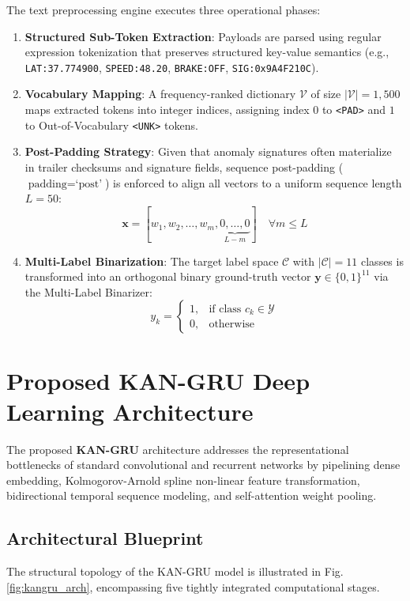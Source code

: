 \documentclass[conference]{IEEEtran}
\begin{document}
The text preprocessing engine executes three operational phases:
\begin{enumerate}
    \item \textbf{Structured Sub-Token Extraction}: Payloads are parsed using regular expression tokenization that preserves structured key-value semantics (e.g., \texttt{LAT:37.774900}, \texttt{SPEED:48.20}, \texttt{BRAKE:OFF}, \texttt{SIG:0x9A4F210C}).
    \item \textbf{Vocabulary Mapping}: A frequency-ranked dictionary $\mathcal{V}$ of size $|\mathcal{V}| = 1,500$ maps extracted tokens into integer indices, assigning index $0$ to \texttt{<PAD>} and $1$ to Out-of-Vocabulary \texttt{<UNK>} tokens.
    \item \textbf{Post-Padding Strategy}: Given that anomaly signatures often materialize in trailer checksums and signature fields, sequence post-padding ($\text{padding} = \text{`post'}$) is enforced to align all vectors to a uniform sequence length $L = 50$:
    \begin{equation}
        \mathbf{x} = [w_1, w_2, \dots, w_m, \underbrace{0, \dots, 0}_{L - m}] \quad \forall m \le L
    \end{equation}
    \item \textbf{Multi-Label Binarization}: The target label space $\mathcal{C}$ with $|\mathcal{C}| = 11$ classes is transformed into an orthogonal binary ground-truth vector $\mathbf{y} \in \{0, 1\}^{11}$ via the Multi-Label Binarizer:
    \begin{equation}
        y_k = \begin{cases} 1, & \text{if class } c_k \in \mathcal{Y} \\ 0, & \text{otherwise} \end{cases}
    \end{equation}
\end{enumerate}

\section{Proposed KAN-GRU Deep Learning Architecture}
The proposed \textbf{KAN-GRU} architecture addresses the representational bottlenecks of standard convolutional and recurrent networks by pipelining dense embedding, Kolmogorov-Arnold spline non-linear feature transformation, bidirectional temporal sequence modeling, and self-attention weight pooling.

\subsection{Architectural Blueprint}
The structural topology of the KAN-GRU model is illustrated in Fig. \ref{fig:kangru_arch}, encompassing five tightly integrated computational stages.
\end{document}
